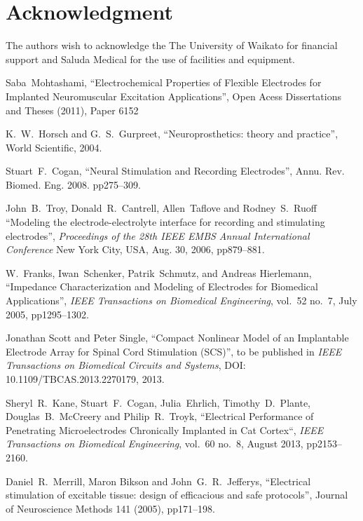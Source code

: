 \documentclass[journal, a4paper]{IEEEtran}
\begin{document}
{\section*{Acknowledgment}
The authors wish to acknowledge the The University of Waikato for financial support and Saluda Medical for the use of facilities and equipment.

\begin{thebibliography}{99}

    Saba~Mohtashami,
    ``Electrochemical Properties of Flexible Electrodes for Implanted Neuromuscular Excitation Applications'',
    Open Acess Dissertations and Theses (2011), Paper 6152

    K.~W.~Horsch and G.~S.~Gurpreet,
    ``Neuroprosthetics: theory and practice'',
    World Scientific, 2004.

    Stuart~F.~Cogan,
    ``Neural Stimulation and Recording Electrodes'',
    Annu. Rev. Biomed. Eng. 2008. pp275--309.

    John~B.~Troy, Donald~R.~Cantrell, Allen~Taflove and Rodney~S.~Ruoff
    ``Modeling the electrode-electrolyte interface for recording and stimulating electrodes'',
    {\em Proceedings of the 28th IEEE EMBS Annual International Conference}
    New York City, USA, Aug. 30, 2006, pp879--881.

W.~Franks, Iwan~Schenker, Patrik~Schmutz, and Andreas Hierlemann,
``Impedance Characterization and Modeling of Electrodes for Biomedical Applications'',
\emph{IEEE Transactions on Biomedical Engineering},
vol.~52 no.~7, July 2005, pp1295--1302.

Jonathan Scott and Peter Single,
``Compact Nonlinear Model of an Implantable Electrode Array for Spinal Cord Stimulation (SCS)'',
to be published in
{\em IEEE Transactions on Biomedical Circuits and Systems},
DOI: 10.1109/TBCAS.2013.2270179, 2013.

Sheryl~R.~Kane, Stuart~F.~Cogan, Julia~Ehrlich, Timothy~D.~Plante, Douglas~B.~McCreery and Philip~R.~Troyk,
``Electrical Performance of Penetrating Microelectrodes Chronically Implanted in Cat Cortex``,
{\em IEEE Transactions on Biomedical Engineering},
vol.~60 no.~8, August 2013, pp2153--2160.

Daniel~R.~Merrill, Maron Bikson and John~G.~R.\ Jefferys,
``Electrical stimulation of excitable tissue: design of efficacious and safe protocols'',
Journal of Neuroscience Methods 141 (2005), pp171--198.


\end{thebibliography}}
\end{document}
